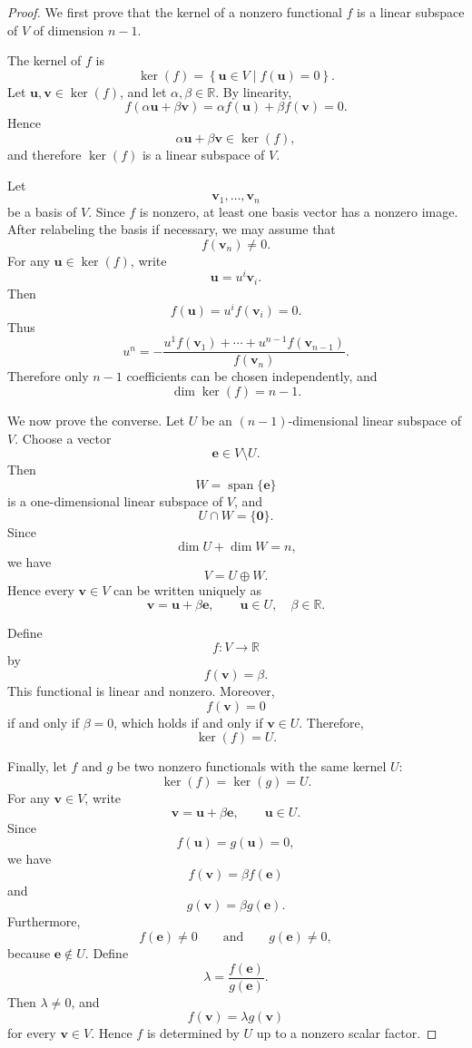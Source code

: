 \documentclass[12pt]{article}
\begin{document}
\begin{proof}
We first prove that the kernel of a nonzero functional \(f\) is a linear
subspace of \(V\) of dimension \(n-1\).

The kernel of \(f\) is
\[
\ker(f)
=
\left\{
\mathbf{u}\in V
\mid
f(\mathbf{u})=0
\right\}.
\]
Let \(\mathbf{u},\mathbf{v}\in\ker(f)\), and let
\(\alpha,\beta\in\mathbb{R}\). By linearity,
\[
f(\alpha\mathbf{u}+\beta\mathbf{v})
=
\alpha f(\mathbf{u})+\beta f(\mathbf{v})
=
0.
\]
Hence
\[
\alpha\mathbf{u}+\beta\mathbf{v}\in\ker(f),
\]
and therefore \(\ker(f)\) is a linear subspace of \(V\).

Let
\[
\mathbf{v}_1,\ldots,\mathbf{v}_n
\]
be a basis of \(V\). Since \(f\) is nonzero, at least one basis vector
has a nonzero image. After relabeling the basis if necessary, we may
assume that
\[
f(\mathbf{v}_n)\neq0.
\]
For any \(\mathbf{u}\in\ker(f)\), write
\[
\mathbf{u}=u^i\mathbf{v}_i.
\]
Then
\[
f(\mathbf{u})
=
u^i f(\mathbf{v}_i)
=
0.
\]
Thus
\[
u^n
=
-\frac{
u^1f(\mathbf{v}_1)+\cdots+u^{n-1}f(\mathbf{v}_{n-1})
}{
f(\mathbf{v}_n)
}.
\]
Therefore only \(n-1\) coefficients can be chosen independently, and
\[
\dim\ker(f)=n-1.
\]

We now prove the converse. Let \(U\) be an \((n-1)\)-dimensional linear
subspace of \(V\). Choose a vector
\[
\mathbf{e}\in V\setminus U.
\]
Then
\[
W=\operatorname{span}\{\mathbf{e}\}
\]
is a one-dimensional linear subspace of \(V\), and
\[
U\cap W=\{\mathbf{0}\}.
\]
Since
\[
\dim U+\dim W=n,
\]
we have
\[
V=U\oplus W.
\]
Hence every \(\mathbf{v}\in V\) can be written uniquely as
\[
\mathbf{v}=\mathbf{u}+\beta\mathbf{e},
\qquad
\mathbf{u}\in U,\quad \beta\in\mathbb{R}.
\]

Define
\[
f:V\longrightarrow\mathbb{R}
\]
by
\[
f(\mathbf{v})=\beta.
\]
This functional is linear and nonzero. Moreover,
\[
f(\mathbf{v})=0
\]
if and only if \(\beta=0\), which holds if and only if
\(\mathbf{v}\in U\). Therefore,
\[
\ker(f)=U.
\]

Finally, let \(f\) and \(g\) be two nonzero functionals with the same
kernel \(U\):
\[
\ker(f)=\ker(g)=U.
\]
For any \(\mathbf{v}\in V\), write
\[
\mathbf{v}=\mathbf{u}+\beta\mathbf{e},
\qquad
\mathbf{u}\in U.
\]
Since
\[
f(\mathbf{u})=g(\mathbf{u})=0,
\]
we have
\[
f(\mathbf{v})=\beta f(\mathbf{e})
\]
and
\[
g(\mathbf{v})=\beta g(\mathbf{e}).
\]
Furthermore,
\[
f(\mathbf{e})\neq0
\qquad\text{and}\qquad
g(\mathbf{e})\neq0,
\]
because \(\mathbf{e}\notin U\). Define
\[
\lambda
=
\frac{f(\mathbf{e})}{g(\mathbf{e})}.
\]
Then \(\lambda\neq0\), and
\[
f(\mathbf{v})
=
\lambda g(\mathbf{v})
\]
for every \(\mathbf{v}\in V\). Hence \(f\) is determined by \(U\) up to
a nonzero scalar factor.
\end{proof}
\end{document}
